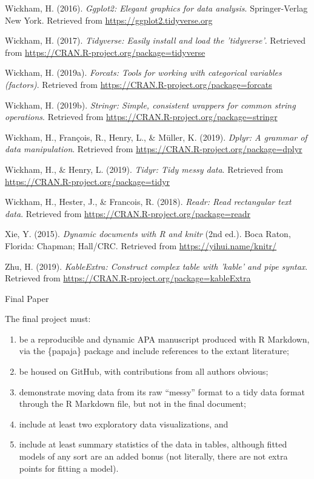 \documentclass[man,floatsintext]{apa6}
\providecommand{\tightlist}{%
  \setlength{\itemsep}{0pt}\setlength{\parskip}{0pt}}
\begin{document}
\leavevmode\hypertarget{ref-R-ggplot2}{}%
Wickham, H. (2016). \emph{Ggplot2: Elegant graphics for data analysis}. Springer-Verlag New York. Retrieved from \url{https://ggplot2.tidyverse.org}

\leavevmode\hypertarget{ref-R-tidyverse}{}%
Wickham, H. (2017). \emph{Tidyverse: Easily install and load the 'tidyverse'}. Retrieved from \url{https://CRAN.R-project.org/package=tidyverse}

\leavevmode\hypertarget{ref-R-forcats}{}%
Wickham, H. (2019a). \emph{Forcats: Tools for working with categorical variables (factors)}. Retrieved from \url{https://CRAN.R-project.org/package=forcats}

\leavevmode\hypertarget{ref-R-stringr}{}%
Wickham, H. (2019b). \emph{Stringr: Simple, consistent wrappers for common string operations}. Retrieved from \url{https://CRAN.R-project.org/package=stringr}

\leavevmode\hypertarget{ref-R-dplyr}{}%
Wickham, H., François, R., Henry, L., \& Müller, K. (2019). \emph{Dplyr: A grammar of data manipulation}. Retrieved from \url{https://CRAN.R-project.org/package=dplyr}

\leavevmode\hypertarget{ref-R-tidyr}{}%
Wickham, H., \& Henry, L. (2019). \emph{Tidyr: Tidy messy data}. Retrieved from \url{https://CRAN.R-project.org/package=tidyr}

\leavevmode\hypertarget{ref-R-readr}{}%
Wickham, H., Hester, J., \& Francois, R. (2018). \emph{Readr: Read rectangular text data}. Retrieved from \url{https://CRAN.R-project.org/package=readr}

\leavevmode\hypertarget{ref-R-knitr}{}%
Xie, Y. (2015). \emph{Dynamic documents with R and knitr} (2nd ed.). Boca Raton, Florida: Chapman; Hall/CRC. Retrieved from \url{https://yihui.name/knitr/}

\leavevmode\hypertarget{ref-R-kableExtra}{}%
Zhu, H. (2019). \emph{KableExtra: Construct complex table with 'kable' and pipe syntax}. Retrieved from \url{https://CRAN.R-project.org/package=kableExtra}

\endgroup

Final Paper

The final project must:

\begin{enumerate}
\def\labelenumi{(\alph{enumi})}
\tightlist
\item
  be a reproducible and dynamic APA manuscript produced with R Markdown, via
  the \{papaja\} package and include references to the extant literature;
\item
  be housed on GitHub, with contributions from all authors obvious;
\item
  demonstrate moving data from its raw \enquote{messy} format to a tidy data format
  through the R Markdown file, but not in the final document;
\item
  include at least two exploratory data visualizations, and
\item
  include at least summary statistics of the data in tables, although fitted
  models of any sort are an added bonus (not literally, there are not extra points
  for fitting a model).
\end{enumerate}
\end{document}
